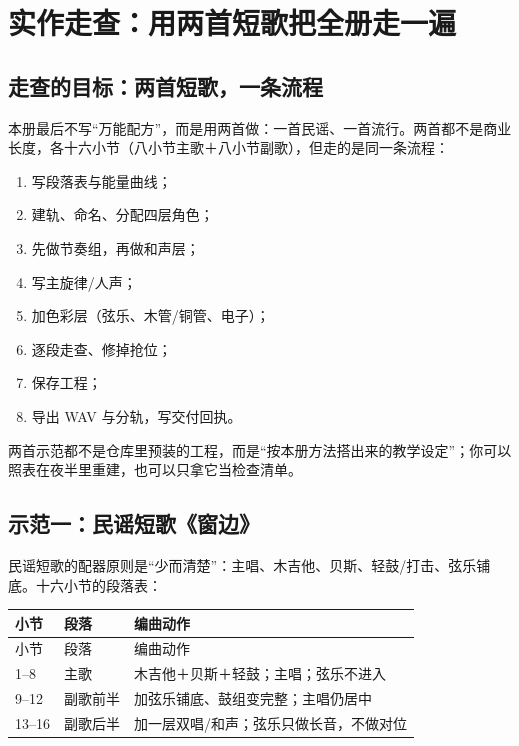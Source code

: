\chapter{实作走查：用两首短歌把全册走一遍}
\label{ch:walkthrough}


\section{走查的目标：两首短歌，一条流程}
\label{sec:walkthrough-goal}

本册最后不写“万能配方”，而是用两首做：一首民谣、一首流行。两首都不是商业长度，各十六小节（八小节主歌＋八小节副歌），但走的是同一条流程：

\begin{enumerate}
\item 写段落表与能量曲线；
\item 建轨、命名、分配四层角色；
\item 先做节奏组，再做和声层；
\item 写主旋律/人声；
\item 加色彩层（弦乐、木管/铜管、电子）；
\item 逐段走查、修掉抢位；
\item 保存工程；
\item 导出 WAV 与分轨，写交付回执。
\end{enumerate}

两首示范都不是仓库里预装的工程，而是“按本册方法搭出来的教学设定”；你可以照表在夜半里重建，也可以只拿它当检查清单。

\section{示范一：民谣短歌《窗边》}
\label{sec:folk-demo}

民谣短歌的配器原则是“少而清楚”：主唱、木吉他、贝斯、轻鼓/打击、弦乐铺底。十六小节的段落表：

\begin{longtable}{p{}p{}p{}}
\toprule
小节 & 段落 & 编曲动作 \\
\midrule
\endfirsthead
\toprule
小节 & 段落 & 编曲动作 \\
\midrule
\endhead
1--8 & 主歌 & 木吉他＋贝斯＋轻鼓；主唱；弦乐不进入 \\
9--12 & 副歌前半 & 加弦乐铺底、鼓组变完整；主唱仍居中 \\
13--16 & 副歌后半 & 加一层双唱/和声；弦乐只做长音，不做对位 \\
\bottomrule
\end{longtable}

